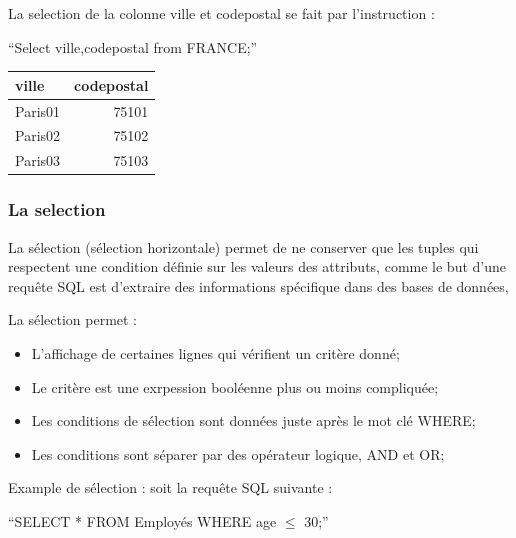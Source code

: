 \documentclass[oneside,13pt,a4paper]{report}
\begin{document}
La selection de la colonne ville et codepostal se fait par l'instruction :

\enquote{Select ville,codepostal from FRANCE;}

\begin{tabular}{|l|r|}
	\hline
	ville & codepostal
	\\
	\hline
	Paris01 & 75101  \\
	Paris02 & 75102 \\
	Paris03 & 75103 \\
	\hline
\end{tabular}

\subsubsection{La selection}

La sélection (sélection horizontale) permet de ne conserver que les tuples qui respectent une condition définie sur les valeurs des attributs,
comme le but d'une requête SQL est d'extraire des informations spécifique dans des bases de données,

La sélection permet :
\begin{itemize}
 	\item L'affichage de certaines lignes qui vérifient un critère donné;
	\item Le critère est une exrpession booléenne plus ou moins compliquée;
	\item Les conditions de sélection sont données juste après le mot clé WHERE;
	\item Les conditions sont séparer par des opérateur logique, AND et OR;
\end{itemize}
\pagebreak

Example de sélection :
soit la requête SQL suivante :

\begin{center}
	\enquote{SELECT * FROM Employés WHERE age $\leq$ 30;}
\end{center}
\end{document}

